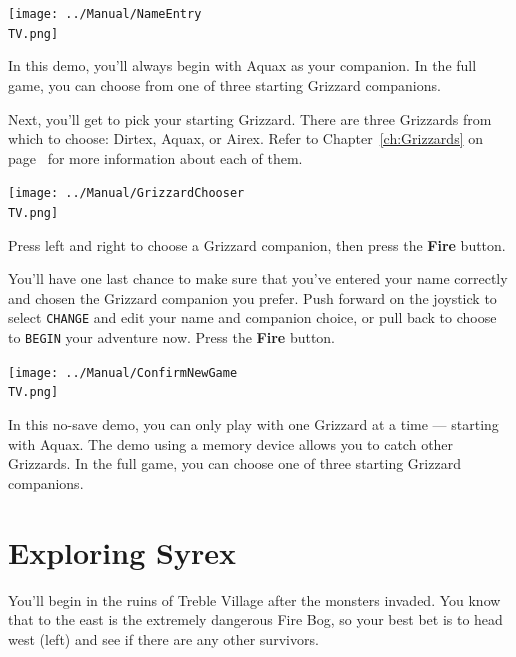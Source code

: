 \documentclass[10pt,twocolumn,openany,article]{memoir}
\newcommand\TV{NTSC}
\newcommand\TV{PAL}
\newcommand\TV{SECAM}
\begin{document}
\begin{center}
  \texttt{[image: ../Manual/NameEntry\\TV.png]}
\end{center}

\ifdefined\DEMO

In this demo,  you'll always begin with Aquax as  your companion. In the
full game, you can choose from one of three starting Grizzard companions.

\else

Next,  you'll  get to  pick  your  starting  Grizzard. There  are  three
Grizzards  from which  to  choose:  Dirtex, Aquax,  or  Airex. Refer  to
Chapter~\ref{ch:Grizzards}   on  page~\pageref{ch:Grizzards}   for  more
information about each of them.

\begin{center}
  \texttt{[image: ../Manual/GrizzardChooser\\TV.png]}
\end{center}

Press left  and right  to choose  a Grizzard  companion, then  press the
\textbf{Fire} button.

You'll have one  last chance to make sure that  you've entered your name
correctly and chosen the Grizzard  companion you prefer. Push forward on
the joystick to select \texttt{CHANGE}  and edit your name and companion
choice, or  pull back  to choose to  \texttt{BEGIN} your  adventure now.
Press the \textbf{Fire} button.

\begin{center}
  \texttt{[image: ../Manual/ConfirmNewGame\\TV.png]}
\end{center}

\fi
\fi
\ifdefined\NOSAVE

In this no-save demo, you can only  play with one Grizzard at a time ---
starting with Aquax. The demo using  a memory device allows you to catch
other Grizzards. In the full game,  you can choose one of three starting
Grizzard companions.

\fi

\section{Exploring Syrex}

You'll begin in the ruins of  Treble Village after the monsters invaded.
You know that to  the east is the extremely dangerous  Fire Bog, so your
best  bet   is  to  head   west  (left)  and   see  if  there   are  any
other survivors.
\end{document}
